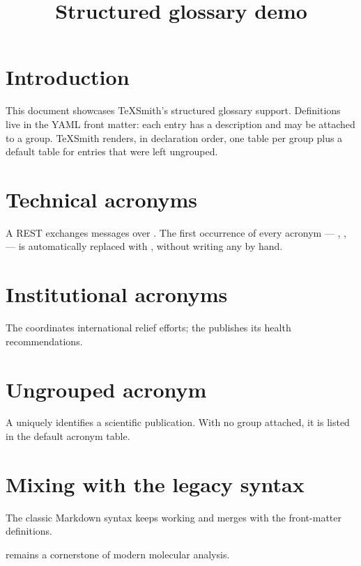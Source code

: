 \documentclass[a4paper,twoside]{article}
\title{Structured glossary demo}
\author{}\date{}
\begin{document}
\maketitle
\tableofcontents
\section{Introduction}
This document showcases TeXSmith's structured glossary support. Definitions
live in the YAML front matter: each entry has a description and may be attached
to a group. TeXSmith renders, in declaration order, one table per group plus a
default table for entries that were left ungrouped.
\section{Technical acronyms}
A REST  exchanges  messages over . The first occurrence of every
acronym --- , ,  --- is automatically replaced with ,
without writing any  by hand.
\section{Institutional acronyms}
The  coordinates international relief efforts; the  publishes its health
recommendations.
\section{Ungrouped acronym}
A  uniquely identifies a scientific publication. With no group attached, it
is listed in the default acronym table.
\section{Mixing with the legacy syntax}
The classic Markdown  syntax keeps working and merges with the
front-matter definitions.

 remains a cornerstone of modern molecular analysis.

\printglossary[type=\acronymtype]\printglossary[type=technical, title={Technical acronyms}]
\printglossary[type=institutional, title={Institutional acronyms}]
\end{document}
